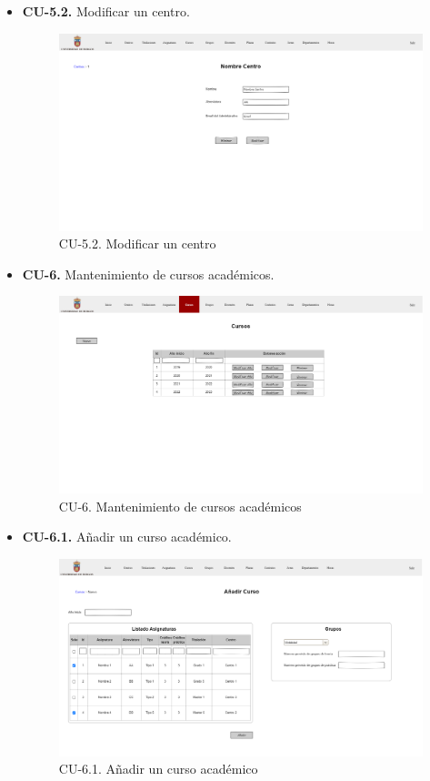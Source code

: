 \begin{itemize}
	\item \textbf{CU-5.2.} Modificar un centro.
	\begin{figure}[!h]
		\centering
		\includegraphics[width=\textwidth]{../img/Anexos/Vistas/mod_centro.png}
		\caption{CU-5.2. Modificar un centro}\label{fig:../img/Anexos/Vistas/mod_centro.png}
	\end{figure}
	
		\item \textbf{CU-6.} Mantenimiento de cursos académicos.
	\begin{figure}[!h]
		\centering
		\includegraphics[width=\textwidth]{../img/Anexos/Vistas/cursos.png}
		\caption{CU-6. Mantenimiento de cursos académicos}\label{fig:../img/Anexos/Vistas/cursos.png}
	\end{figure}
	
	\item \textbf{CU-6.1.} Añadir un curso académico.
	\begin{figure}[!h]
		\centering
		\includegraphics[width=\textwidth]{../img/Anexos/Vistas/add_curso.png}
		\caption{CU-6.1. Añadir un curso académico}\label{fig:../img/Anexos/Vistas/add_curso.png}
	\end{figure}
	

\end{itemize}

